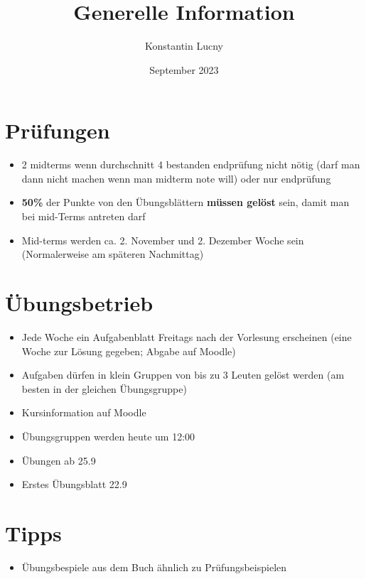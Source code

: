 \documentclass[a4paper,10pt]{article}
\title{Generelle Information}
\author{Konstantin Lucny}
\date{September 2023}
\begin{document}
\maketitle
\section{Prüfungen}
\begin{itemize}
    \item 2 midterms wenn durchschnitt 4 bestanden endprüfung nicht nötig (darf man dann nicht machen wenn man midterm note will) oder nur endprüfung
    \item \textbf{50\%} der Punkte von den Übungsblättern \textbf{müssen gelöst} sein, damit man bei mid-Terms antreten darf
    \item Mid-terms werden ca. 2. November und 2. Dezember Woche sein (Normalerweise am späteren Nachmittag)
\end{itemize}
\section{Übungsbetrieb}
\begin{itemize}
    \item Jede Woche ein Aufgabenblatt Freitags nach der Vorlesung erscheinen (eine Woche zur Lösung gegeben; Abgabe auf Moodle)
    \item Aufgaben dürfen in klein Gruppen von bis zu 3 Leuten gelöst werden (am besten in der gleichen Übungsgruppe)
    \item Kursinformation auf Moodle
    \item Übungsgruppen werden heute um 12:00
    \item Übungen ab 25.9
    \item Erstes Übungsblatt 22.9
\end{itemize}

\section{Tipps}
\begin{itemize}
    \item Übungsbespiele aus dem Buch ähnlich zu Prüfungsbeispielen
\end{itemize}
\end{document}
